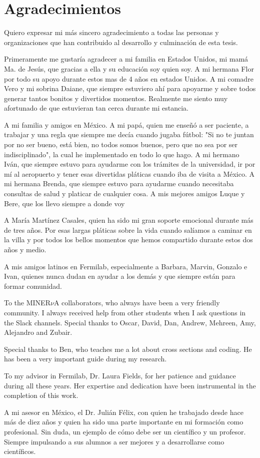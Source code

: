 \chapter*{Agradecimientos}
\label{Cap:Agr1}

Quiero expresar mi más sincero agradecimiento a todas las personas y organizaciones que han contribuido al desarrollo y culminación de esta tesis.

Primeramente me gustaría agradecer a mi familia en Estados Unidos, mi mamá Ma. de Jesús, que gracias a ella y su educación soy quien soy. A mi hermana Flor por todo su apoyo durante estos mas de 4 años en estados Unidos. A mi comadre Vero y mi sobrina Daiane, que siempre estuviero ahí para apoyarme y sobre todos generar tantos bonitos y divertidos momentos. Realmente me siento muy afortunado de que estuvieran tan cerca durante mi estancia.

A mi familia y amigos en México. A mi papá, quien me enseñó a ser paciente, a trabajar y una regla que siempre me decía cuando jugaba fútbol: "Si no te juntan por no ser bueno, está bien, no todos somos buenos, pero que no sea por ser indisciplinado", la cual he implementado en todo lo que hago. A mi hermano Iván, que siempre estuvo para ayudarme con los trámites de la universidad, ir por mí al aeropuerto y tener esas divertidas pláticas cuando iba de visita a México. A mi hermana Brenda, que siempre estuvo para ayudarme cuando necesitaba consultas de salud y platicar de cualquier cosa. A mis mejores amigos Luque y Bere, que los llevo siempre a donde voy 

A María Martínez Casales, quien ha sido mi gran soporte emocional durante más de tres años. Por esas largas pláticas sobre la vida cuando salíamos a caminar en la villa y por todos los bellos momentos que hemos compartido durante estos dos años y medio. 

A mis amigos latinos en Fermilab, especialmente a Barbara, Marvin, Gonzalo e Ivan, quienes nunca dudan en ayudar a los demás y que siempre están para formar comunidad.

To the MINER$\nu$A collaborators, who always have been a very friendly community. I always received help from other students when I ask questions in the Slack channels. Special thanks to Oscar, David, Dan, Andrew, Mehreen, Amy, Alejandro and Zubair.  

Special thanks to Ben, who teaches me a lot about cross sections and coding. He has been a very important guide during my research. 

To my advisor in Fermilab, Dr. Laura Fields, for her patience and guidance during all these years. Her expertise and dedication have been instrumental in the completion of this work.

A mi asesor en México, el Dr. Julián Félix, con quien he trabajado desde hace más de diez años y quien ha sido una parte importante en mi formación como profesional. Sin duda, un ejemplo de cómo debe ser un científico y un profesor. Siempre impulsando a sus alumnos a ser mejores y a desarrollarse como científicos.
	 
\newpage